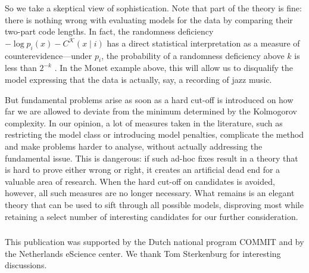 \documentclass{style/llncs}
\newcommand{\K}{\mathscr K}
\begin{document}
So we take a skeptical view of sophistication. Note that part of the theory is fine: there is nothing wrong with evaluating models for the data by comparing their two-part code lengths. In fact, the randomness deficiency $-\log p_i(x)-C^\K(x\mid i)$ has a direct statistical interpretation as a measure of counterevidence---under $p_i$, the probability of a randomness deficiency above $k$ is less than $2^{-k}$ \cite[Lemma~6]{bloem2014safe}. In the Monet example above, this will allow us to disqualify the model expressing that the data is actually, say, a recording of jazz music.

But fundamental problems arise as soon as a hard cut-off is introduced on how far we are allowed to deviate from the minimum determined by the Kolmogorov complexity. In our opinion, a lot of measures taken in the literature, such as restricting the model class or introducing model penalties, complicate the method and make problems harder to analyse, without actually addressing the fundamental issue. This is dangerous: if such ad-hoc fixes result in a theory that is hard to prove either wrong or right, it creates an artificial dead end for a valuable area of research. When the hard cut-off on candidates is avoided, however, all such measures are no longer necessary. What remains is an elegant theory that can be used to sift through all possible models, disproving most while retaining a select number of interesting candidates for our further consideration.

\subsubsection*{\ackname}
This publication was supported by the Dutch national program COMMIT and by  the Netherlands eScience center. We thank Tom Sterkenburg for interesting discussions.




\appendix
\end{document}

